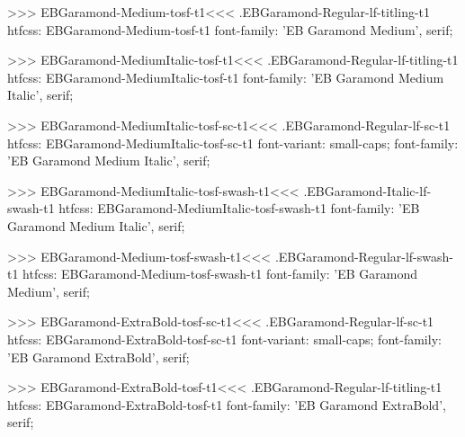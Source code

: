 {{{{{{{>>>
\<EBGaramond-Medium-tosf-t1\><<<
.EBGaramond-Regular-lf-titling-t1
htfcss:  EBGaramond-Medium-tosf-t1  font-family: 'EB Garamond Medium', serif;

>>>
\<EBGaramond-MediumItalic-tosf-t1\><<<
.EBGaramond-Regular-lf-titling-t1
htfcss:  EBGaramond-MediumItalic-tosf-t1  font-family: 'EB Garamond Medium Italic', serif;

>>>
\<EBGaramond-MediumItalic-tosf-sc-t1\><<<
.EBGaramond-Regular-lf-sc-t1
htfcss:  EBGaramond-MediumItalic-tosf-sc-t1  font-variant: small-caps; font-family: 'EB Garamond Medium Italic', serif;

>>>
\<EBGaramond-MediumItalic-tosf-swash-t1\><<<
.EBGaramond-Italic-lf-swash-t1
htfcss:  EBGaramond-MediumItalic-tosf-swash-t1  font-family: 'EB Garamond Medium Italic', serif;

>>>
\<EBGaramond-Medium-tosf-swash-t1\><<<
.EBGaramond-Regular-lf-swash-t1
htfcss:  EBGaramond-Medium-tosf-swash-t1  font-family: 'EB Garamond Medium', serif;

>>>
\<EBGaramond-ExtraBold-tosf-sc-t1\><<<
.EBGaramond-Regular-lf-sc-t1
htfcss:  EBGaramond-ExtraBold-tosf-sc-t1  font-variant: small-caps; font-family: 'EB Garamond ExtraBold', serif;

>>>
\<EBGaramond-ExtraBold-tosf-t1\><<<
.EBGaramond-Regular-lf-titling-t1
htfcss:  EBGaramond-ExtraBold-tosf-t1  font-family: 'EB Garamond ExtraBold', serif;

}}}}}}}
